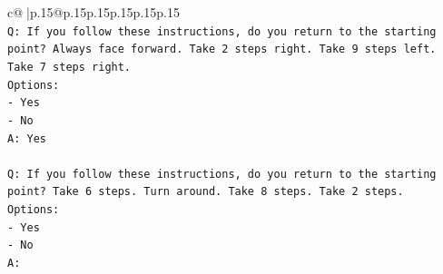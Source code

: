 \documentclass{article}
\begin{document}
{\begin{supertabular}{c@{$\;$}|p{.15\linewidth}@{}p{.15\linewidth}p{.15\linewidth}p{.15\linewidth}p{.15\linewidth}p{.15\linewidth}}
{{{\\ 
\texttt{Q: If you follow these instructions, do you return to the starting point? Always face forward. Take 2 steps right. Take 9 steps left. Take 7 steps right.} \\
\texttt{Options:} \\
\texttt{{-} Yes} \\
\texttt{{-} No} \\
\texttt{A: Yes} \\
\\ 
\texttt{Q: If you follow these instructions, do you return to the starting point? Take 6 steps. Turn around. Take 8 steps. Take 2 steps.} \\
\texttt{Options:} \\
\texttt{{-} Yes} \\
\texttt{{-} No} \\
\texttt{A:} \\
            }
        }
    }
     \\ \\


\end{supertabular}}
\end{document}
